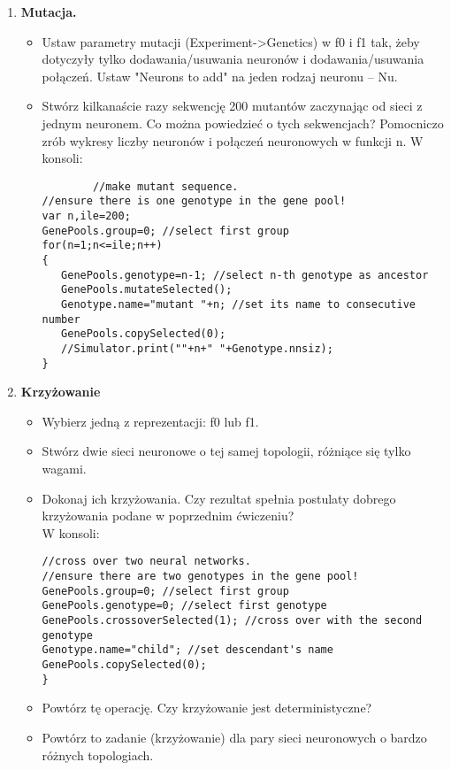 \begin{enumerate}
\item \textbf{Mutacja.}
	\begin{itemize}
		\item Ustaw parametry mutacji (Experiment->Genetics) w f0 i f1 tak, żeby dotyczyły tylko dodawania/usuwania neuronów i dodawania/usuwania połączeń. Ustaw "Neurons to add" na jeden rodzaj neuronu – Nu.
		\item Stwórz kilkanaście razy sekwencję 200 mutantów zaczynając od sieci z jednym neuronem. Co można powiedzieć o tych sekwencjach? Pomocniczo zrób wykresy liczby neuronów i połączeń neuronowych w funkcji n. 
W konsoli:
		\begin{verbatim}
		//make mutant sequence.
//ensure there is one genotype in the gene pool! 
var n,ile=200;
GenePools.group=0; //select first group
for(n=1;n<=ile;n++)
{
   GenePools.genotype=n-1; //select n-th genotype as ancestor
   GenePools.mutateSelected();
   Genotype.name="mutant "+n; //set its name to consecutive number
   GenePools.copySelected(0);
   //Simulator.print(""+n+" "+Genotype.nnsiz);
}
		\end{verbatim}
		
	\end{itemize}
\item \textbf{Krzyżowanie}
	\begin{itemize}
		\item Wybierz jedną z reprezentacji: f0 lub f1.
		\item Stwórz dwie sieci neuronowe o tej samej topologii, różniące się tylko wagami.
		\item Dokonaj ich krzyżowania. Czy rezultat spełnia postulaty dobrego krzyżowania podane w poprzednim ćwiczeniu? 
		\\W konsoli:
				\begin{verbatim}
//cross over two neural networks.
//ensure there are two genotypes in the gene pool! 
GenePools.group=0; //select first group
GenePools.genotype=0; //select first genotype
GenePools.crossoverSelected(1); //cross over with the second genotype
Genotype.name="child"; //set descendant's name
GenePools.copySelected(0);
}
		\end{verbatim}
		\item Powtórz tę operację. Czy krzyżowanie jest deterministyczne?
		\item Powtórz to zadanie (krzyżowanie) dla pary sieci neuronowych o bardzo różnych topologiach.
	\end{itemize}
\end{enumerate}